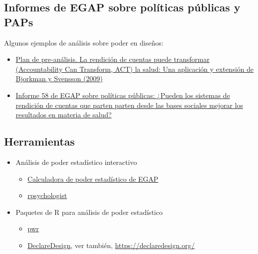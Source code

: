 \documentclass[12pt,spanish,]{book}
\begin{document}
\hypertarget{informes-de-egap-sobre-poluxedticas-puxfablicas-y-paps}{%
\subsection{Informes de EGAP sobre políticas públicas y PAPs}\label{informes-de-egap-sobre-poluxedticas-puxfablicas-y-paps}}

Algunos ejemplos de análisis sobre poder en diseños:

\begin{itemize}
\item
  \href{https://osf.io/qxwmu/}{Plan de pre-análisis. La rendición de cuentas puede transformar (Accountability Can Transform, ACT) la salud: Una aplicación y extensión de Bjorkman y Svensson (2009)}
\item
  \href{https://egap.org/resource/does-bottom-up-accountability-work-evidence-from-uganda/}{Informe 58 de EGAP sobre políticas públicas: ¿Pueden los sistemas de rendición de cuentas que parten parten desde las bases sociales mejorar los resultados en materia de salud?}
\end{itemize}

\hypertarget{herramientas-3}{%
\subsection{Herramientas}\label{herramientas-3}}

\begin{itemize}
\item
  Análisis de poder estadístico interactivo

  \begin{itemize}
  \item
    \href{https://egap.shinyapps.io/power-app/}{Calculadora de poder estadístico de EGAP}
  \item
    \href{https://rpsychologist.com/d3/NHST/}{rpsychologist}
  \end{itemize}
\item
  Paquetes de R para análisis de poder estadístico

  \begin{itemize}
  \item
    \href{https://cran.r-project.org/web/packages/pwr/index.html}{pwr}
  \item
    \href{https://cran.r-project.org/web/packages/DeclareDesign/index.html}{DeclareDesign}, ver también, \url{https://declaredesign.org/}
  \end{itemize}
\end{itemize}
\end{document}
